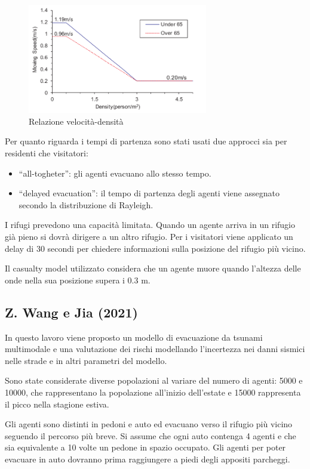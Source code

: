 \begin{figure}[ht]
    \centering
    \includegraphics[width=0.7\textwidth]{images/speed_Linear.png}
    \caption{Relazione velocità-densità \textcite[]{takabatake2017simulated}}
    \label{fig:speed-linear}
\end{figure}

Per quanto riguarda i tempi di partenza sono stati usati due approcci sia per residenti che visitatori:
\begin{itemize}
    \item ``all-togheter'': gli agenti evacuano allo stesso tempo.
    \item ``delayed evacuation'': il tempo di partenza degli agenti viene assegnato secondo la distribuzione di Rayleigh.
\end{itemize}

I rifugi prevedono una capacità limitata. Quando un agente arriva in un rifugio già pieno si dovrà dirigere a un altro rifugio.
Per i visitatori viene applicato un delay di 30 secondi per chiedere informazioni sulla posizione del rifugio più vicino.

Il casualty model utilizzato considera che un agente muore quando l'altezza delle onde nella sua posizione supera i 0.3 m.


\subsection{Z. Wang e Jia (2021)}
In questo lavoro viene proposto un modello di evacuazione da tsunami multimodale e una valutazione dei rischi modellando l'incertezza
nei danni sismici nelle strade e in altri parametri del modello.

Sono state considerate diverse popolazioni al variare del numero di agenti: 5000 e 10000,
che rappresentano la popolazione all'inizio dell'estate e 15000 rappresenta il picco nella stagione estiva.

Gli agenti sono distinti in pedoni e auto ed evacuano verso il rifugio più vicino seguendo il percorso più breve.
Si assume che ogni auto contenga 4 agenti e che sia equivalente a 10 volte un pedone in spazio occupato.
Gli agenti per poter evacuare in auto dovranno prima raggiungere a piedi degli appositi parcheggi.

